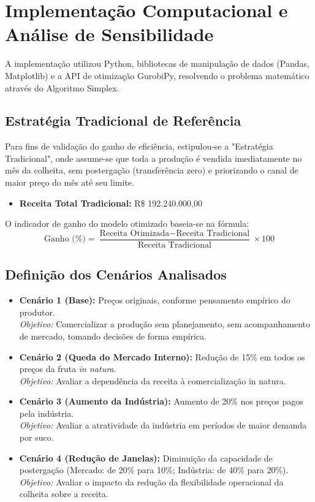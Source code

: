 \documentclass[12pt, a4paper]{article}
\begin{document}
\section{Implementação Computacional e Análise de Sensibilidade}

A implementação utilizou Python, bibliotecas de manipulação de dados (Pandas, Matplotlib) e a API de otimização GurobiPy, resolvendo o problema matemático através do Algoritmo Simplex. 

\subsection{Estratégia Tradicional de Referência}
Para fins de validação do ganho de eficiência, estipulou-se a "Estratégia Tradicional", onde assume-se que toda a produção é vendida imediatamente no mês da colheita, sem postergação (transferência zero) e priorizando o canal de maior preço do mês até seu limite.
\begin{itemize}
    \item \textbf{Receita Total Tradicional:} R\$ 192.240.000,00
\end{itemize}

O indicador de ganho do modelo otimizado baseia-se na fórmula:
\begin{equation*}
    \text{Ganho (\%)} = \frac{\text{Receita Otimizada} - \text{Receita Tradicional}}{\text{Receita Tradicional}} \times 100
\end{equation*}

\subsection{Definição dos Cenários Analisados}
\begin{itemize}
    \item \textbf{Cenário 1 (Base):} Preços originais, conforme pensamento empírico do produtor. \\
    \textit{Objetivo:} Comercializar a produção sem planejamento, sem acompanhamento de mercado, tomando decisões de forma empírica.
    
    \item \textbf{Cenário 2 (Queda do Mercado Interno):} Redução de 15\% em todos os preços da fruta \textit{in natura}. \\
    \textit{Objetivo:} Avaliar a dependência da receita à comercialização in natura.
    
    \item \textbf{Cenário 3 (Aumento da Indústria):} Aumento de 20\% nos preços pagos pela indústria. \\
    \textit{Objetivo:} Avaliar a atratividade da indústria em períodos de maior demanda por suco.
    
    \item \textbf{Cenário 4 (Redução de Janelas):} Diminuição da capacidade de postergação (Mercado: de 20\% para 10\%; Indústria: de 40\% para 20\%). \\
    \textit{Objetivo:} Avaliar o impacto da redução da flexibilidade operacional da colheita sobre a receita.
\end{itemize}
\end{document}
